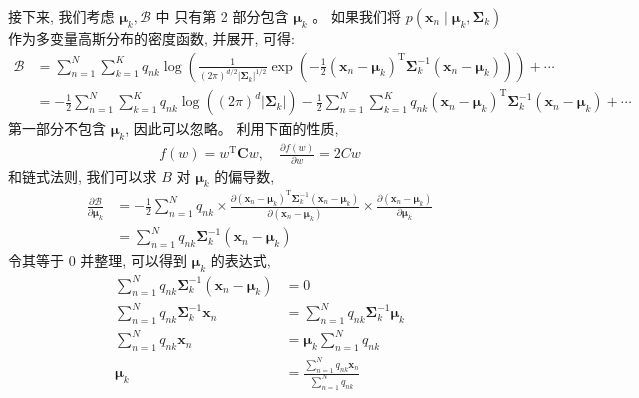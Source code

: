 \documentclass[UTF8]{ctexart}
\begin{document}
接下来, 我们考虑 $\boldsymbol{\mu}_{k}, \mathcal{B}$ 中
只有第 2 部分包含 $\boldsymbol{\mu}_{k}$ 。
如果我们将 $p\left(\boldsymbol{x}_{n} \mid \boldsymbol{\mu}_{k}, \boldsymbol{\Sigma}_{k}\right)$ 
作为多变量高斯分布的密度函数, 并展开, 可得:
$$
\begin{aligned}
\mathcal{B} &=\sum_{n=1}^{N} \sum_{k=1}^{K} q_{n k} \log \left(\frac{1}{(2 \pi)^{d / 2}\left|\boldsymbol{\Sigma}_{k}\right|^{1 / 2}} \exp \left(-\frac{1}{2}\left(\boldsymbol{x}_{n}-\boldsymbol{\mu}_{k}\right)^{\mathrm{T}} \boldsymbol{\Sigma}_{k}^{-1}\left(\boldsymbol{x}_{n}-\boldsymbol{\mu}_{k}\right)\right)\right)+\cdots \\
&=-\frac{1}{2} \sum_{n=1}^{N} \sum_{k=1}^{K} q_{n k} \log \left((2 \pi)^{d}\left|\boldsymbol{\Sigma}_{k}\right|\right)-\frac{1}{2} \sum_{n=1}^{N} \sum_{k=1}^{K} q_{n k}\left(\boldsymbol{x}_{n}-\boldsymbol{\mu}_{k}\right)^{\mathrm{T}} \boldsymbol{\Sigma}_{k}^{-1}\left(\boldsymbol{x}_{n}-\boldsymbol{\mu}_{k}\right)+\cdots
\end{aligned}
$$
第一部分不包含 $\boldsymbol{\mu}_{k}$, 因此可以忽略。
利用下面的性质,
$$
\begin{aligned}
f(w)=w^{\mathrm{T}} \boldsymbol{C} w, \quad \frac{\partial f(w)}{\partial w}=2 C w
\end{aligned}
$$
和链式法则, 我们可以求 $B$ 对 $\boldsymbol{\mu}_{k}$ 的偏导数,
$$
\begin{aligned}
\frac{\partial \mathcal{B}}{\partial \boldsymbol{\mu}_{k}} &=-\frac{1}{2} \sum_{n=1}^{N} q_{nk} \times \frac{\partial\left(\boldsymbol{x}_{n}-\boldsymbol{\mu}_{k}\right)^{\mathrm{T}} \boldsymbol{\Sigma}_{k}^{-1}\left(\boldsymbol{x}_{n}-\boldsymbol{\mu}_{k}\right)}{\partial\left(\boldsymbol{x}_{n}-\boldsymbol{\mu}_{k}\right)} \times \frac{\partial\left(\boldsymbol{x}_{n}-\boldsymbol{\mu}_{k}\right)}{\partial \boldsymbol{\mu}_{k}} \\
&=\sum_{n=1}^{N} q_{n k} \boldsymbol{\Sigma}_{k}^{-1}\left(\boldsymbol{x}_{n}-\boldsymbol{\mu}_{k}\right)
\end{aligned}
$$
令其等于 0 并整理, 可以得到 $\boldsymbol{\mu}_{k}$ 的表达式,
$$
\begin{aligned}
\sum_{n=1}^{N} q_{n k} \boldsymbol{\Sigma}_{k}^{-1}\left(\boldsymbol{x}_{n}-\boldsymbol{\mu}_{k}\right) &=0 \\
\sum_{n=1}^{N} q_{n k} \boldsymbol{\Sigma}_{k}^{-1} \boldsymbol{x}_{n} &=\sum_{n=1}^{N} q_{n k} \boldsymbol{\Sigma}_{k}^{-1} \boldsymbol{\mu}_{k} \\
\sum_{n=1}^{N} q_{n k} \boldsymbol{x}_{n} &=\boldsymbol{\mu}_{k} \sum_{n=1}^{N} q_{n k} \\
\boldsymbol{\mu}_{k} &=\frac{\sum_{n=1}^{N} q_{n k} \boldsymbol{x}_{n}}{\sum_{n=1}^{N} q_{n k}}
\end{aligned}
$$
\end{document}

